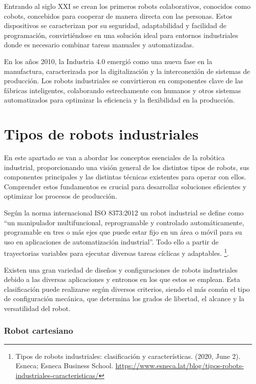 Entrando al siglo XXI se crean los primeros robots colaborativos, conocidos como cobots, concebidos para cooperar de manera directa con las personas. Estos dispositivos se caracterizan por su seguridad, adaptabilidad y facilidad de programación, convirtiéndose en una solución ideal para entornos industriales donde es necesario combinar tareas manuales y automatizadas. 

En los años 2010, la Industria 4.0 emergió como una nueva fase en la manufactura, caracterizada por la digitalización y la interconexión de sistemas de producción.  Los robots industriales se convirtieron en componentes clave de las fábricas inteligentes, colaborando estrechamente con humanos y otros sistemas automatizados para optimizar la eficiencia y la flexibilidad en la producción. 

\section{Tipos de robots industriales}
\label{sec:terceraseccion}

En este apartado se van a abordar los conceptos esenciales de la robótica industrial, proporcionando una visión general de los distintos tipos de robots, sus componentes principales y las distintas técnicas existentes para operar con ellos. Comprender estos fundamentos es crucial para desarrollar soluciones eficientes y optimizar los procesos de producción.

 Según la norma internacional ISO 8373:2012 un robot industrial se define como ``un manipulador multifuncional, reprogramable y controlado automáticamente, programable en tres o más ejes que puede estar fijo en un área o móvil para su uso en aplicaciones de automatización industrial''. Todo ello a partir de trayectorias variables para ejecutar diversas tareas cíclicas y adaptables. \footnote{Tipos de robots industriales: clasificación y características. (2020, June 2). Esneca; Esneca Business School. 
 \url{ https://www.esneca.lat/blog/tipos-robots-industriales-caracteristicas/}}. 
 
Existen una gran variedad de diseños y configuraciones de robots industriales debido a las diversas aplicaciones y entronos en los que estos se emplean. Esta clasificación puede realizarse según diversos criterios, siendo el más común el tipo de configuración mecánica, que determina los grados de libertad, el alcance y la versatilidad del robot.

\subsubsection{Robot cartesiano}

